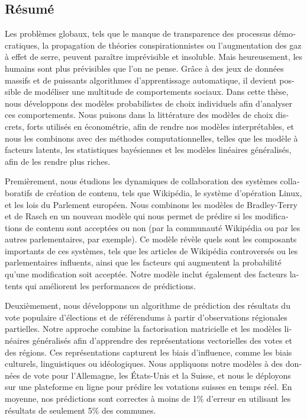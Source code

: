 \begin{otherlanguage}{french}
	\chapter*{Résumé}

	Les problèmes globaux, tels que le manque de transparence des processus démocratiques, la propagation de théories conspirationnistes ou l'augmentation des gaz à effet de serre, peuvent paraître imprévisible et insoluble.
	Mais heureusement, les humains sont plus prévisibles que l'on ne pense.
	Grâce à des jeux de données massifs et de puissants algorithmes d'apprentissage automatique, il devient possible de modéliser une multitude de comportements sociaux.
	Dans cette thèse, nous développons des modèles probabilistes de choix individuels afin d'analyser ces comportements.
	Nous puisons dans la littérature des modèles de choix discrets, forts utilisés en économétrie, afin de rendre nos modèles interprétables, et nous les combinons avec des méthodes computationnelles, telles que les modèle à facteurs latents, les statistiques bayésiennes et les modèles linéaires généralisés, afin de les rendre plus riches.

	Premièrement, nous étudions les dynamiques de collaboration des systèmes collaboratifs de création de contenu, tels que Wikipédia, le système d'opération Linux, et les lois du Parlement européen.
	Nous combinons les modèles de Bradley-Terry et de Rasch en un nouveau modèle qui nous permet de prédire si les modifications de contenu sont acceptées ou non (par la communauté Wikipédia ou par les autres parlementaires, par exemple).
	Ce modèle révèle quels sont les composants importants de ces systèmes, tels que les articles de Wikipédia controversés ou les parlementaires influents, ainsi que les facteurs qui augmentent la probabilité qu'une modification soit acceptée.
	Notre modèle inclut également des facteurs latents qui améliorent les performances de prédictions.

	Deuxièmement, nous développons un algorithme de prédiction des résultats du vote populaire d'élections et de référendums à partir d'observations régionales partielles.
	Notre approche combine la factorisation matricielle et les modèles linéaires généralisés afin d'apprendre des représentations vectorielles des votes et des régions.
	Ces représentations capturent les biais d'influence, comme les biais culturels, linguistiques ou idéologiques.
	Nous appliquons notre modèles à des données de vote pour l'Allemagne, les États-Unis et la Suisse, et nous le déployons sur une plateforme en ligne pour prédire les votations suisses en temps réel.
	En moyenne, nos prédictions sont correctes à moins de 1\% d'erreur en utilisant les résultats de seulement 5\% des communes.


\end{otherlanguage}
